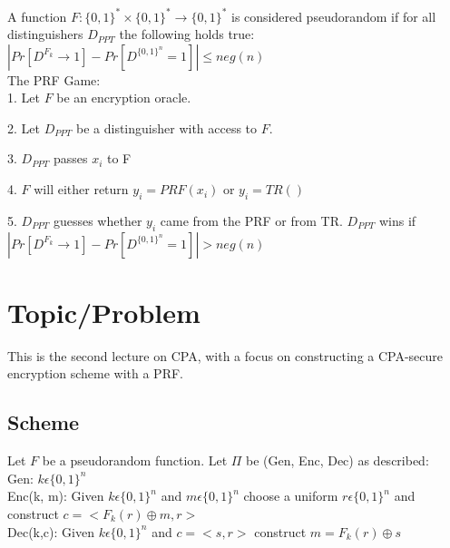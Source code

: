 \documentclass[11pt]{article}
\begin{document}
A function $F: \{0,1\}^* \times \{0,1\}^* \rightarrow \{0,1\}^*$ is considered pseudorandom if for all distinguishers $D_{PPT}$ the following holds true:\\

$|Pr[D^{F_k}\rightarrow 1] - Pr[D^{\{0,1\}^n}=1]| \leq neg(n)$\\


The PRF Game:\\

	\hspace{\parindent} 1. Let $F$ be an encryption oracle.
	
	\hspace{\parindent} 2. Let $D_{PPT}$ be a distinguisher with access to $F$.
	
	\hspace{\parindent} 3. $D_{PPT}$ passes $x_i$ to F
	
	\hspace{\parindent} 4. $F$ will either return $y_i = PRF(x_i)$ or $y_i = TR()$
	
	\hspace{\parindent} 5. $D_{PPT}$ guesses whether $y_i$ came from the PRF or from TR. $D_{PPT}$ wins if $|Pr[D^{F_k}\rightarrow 1] - Pr[D^{\{0,1\}^n}=1]| > neg(n)$\\
	

\section*{Topic/Problem}
This is the second lecture on CPA, with a focus on constructing a CPA-secure encryption scheme with a PRF.

\subsection*{Scheme}
Let $F$ be a pseudorandom function. Let $\Pi$ be (Gen, Enc, Dec) as described:\\

\hspace{\parindent} Gen: $k \epsilon \{0,1\}^n$\\

\hspace{\parindent} Enc(k, m): Given $k \epsilon \{0,1\}^n$ and $m \epsilon \{0,1\}^n$ choose a uniform $r \epsilon \{0,1\}^n$ and construct $c = <F_k(r)\oplus m, r>$\\

\hspace{\parindent} Dec(k,c): Given $k \epsilon \{0,1\}^n$ and $c=<s,r>$ construct $m= F_k(r)\oplus s$
\end{document}
